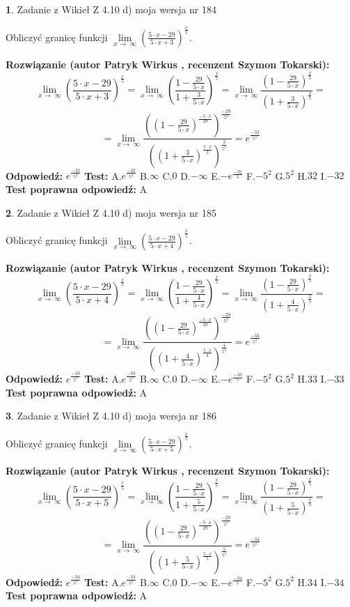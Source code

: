 \documentclass[12pt, a4paper]{article}
\theoremstyle{definition} %
\newtheorem{zad}{}
\newcommand{\zadStart}[1]{\begin{zad}#1\newline}
\newcommand{\zadStop}{\end{zad}}
\newcommand{\rozwStart}[2]{\noindent \textbf{Rozwiązanie (autor #1 , recenzent #2): }\newline}
\newcommand{\rozwStop}{\newline}
\newcommand{\odpStart}{\noindent \textbf{Odpowiedź:}\newline}
\newcommand{\odpStop}{\newline}
\newcommand{\testStart}{\noindent \textbf{Test:}\newline}
\newcommand{\testStop}{\newline}
\newcommand{\kluczStart}{\noindent \textbf{Test poprawna odpowiedź:}\newline}
\newcommand{\kluczStop}{\newline}
\begin{document}
\zadStart{Zadanie z Wikieł Z 4.10 d) moja wersja nr 184}


Obliczyć granicę funkcji  $\lim\limits_{x\to\ \infty}(\frac{5\cdot x-29}{5\cdot x+3})^{\frac{x}{5}}$.
\zadStop
\rozwStart{Patryk Wirkus}{Szymon Tokarski}
$$\lim\limits_{x\to\ \infty}(\frac{5\cdot x-29}{5\cdot x+3})^{\frac{x}{5}} = \lim\limits_{x\to\ \infty}(\frac{1-\frac{29}{5\cdot x}}{1+\frac{3}{5\cdot x}})^{\frac{x}{5}}=\lim\limits_{x\to\ \infty}\frac{(1-\frac{29}{5\cdot x})^{\frac{x}{5}}}{(1+\frac{3}{5\cdot x})^{\frac{x}{5}}}=$$
$$=\lim\limits_{x\to\ \infty}\frac{((1-\frac{29}{5\cdot x})^{\frac{-5\cdot x}{29}})^{\frac{-29}{5^{2}}}}{((1+\frac{3}{5\cdot x})^{\frac{5\cdot x}{3}})^{\frac{3}{5^{2}}}}=e^{\frac{-32}{5^{2}}}$$
\rozwStop
\odpStart
$e^{\frac{-32}{5^{2}}}$
\odpStop
\testStart
A.$e^{\frac{-32}{5^{2}}}$ B.$\infty$ C.$0$ D.$-\infty$ E.$-e^{\frac{-32}{5}}$
F.$-5^{2}$ G.$5^{2}$
H.$32$
I.$-32$
\testStop
\kluczStart
A
\kluczStop



\zadStart{Zadanie z Wikieł Z 4.10 d) moja wersja nr 185}


Obliczyć granicę funkcji  $\lim\limits_{x\to\ \infty}(\frac{5\cdot x-29}{5\cdot x+4})^{\frac{x}{5}}$.
\zadStop
\rozwStart{Patryk Wirkus}{Szymon Tokarski}
$$\lim\limits_{x\to\ \infty}(\frac{5\cdot x-29}{5\cdot x+4})^{\frac{x}{5}} = \lim\limits_{x\to\ \infty}(\frac{1-\frac{29}{5\cdot x}}{1+\frac{4}{5\cdot x}})^{\frac{x}{5}}=\lim\limits_{x\to\ \infty}\frac{(1-\frac{29}{5\cdot x})^{\frac{x}{5}}}{(1+\frac{4}{5\cdot x})^{\frac{x}{5}}}=$$
$$=\lim\limits_{x\to\ \infty}\frac{((1-\frac{29}{5\cdot x})^{\frac{-5\cdot x}{29}})^{\frac{-29}{5^{2}}}}{((1+\frac{4}{5\cdot x})^{\frac{5\cdot x}{4}})^{\frac{4}{5^{2}}}}=e^{\frac{-33}{5^{2}}}$$
\rozwStop
\odpStart
$e^{\frac{-33}{5^{2}}}$
\odpStop
\testStart
A.$e^{\frac{-33}{5^{2}}}$ B.$\infty$ C.$0$ D.$-\infty$ E.$-e^{\frac{-33}{5}}$
F.$-5^{2}$ G.$5^{2}$
H.$33$
I.$-33$
\testStop
\kluczStart
A
\kluczStop



\zadStart{Zadanie z Wikieł Z 4.10 d) moja wersja nr 186}


Obliczyć granicę funkcji  $\lim\limits_{x\to\ \infty}(\frac{5\cdot x-29}{5\cdot x+5})^{\frac{x}{5}}$.
\zadStop
\rozwStart{Patryk Wirkus}{Szymon Tokarski}
$$\lim\limits_{x\to\ \infty}(\frac{5\cdot x-29}{5\cdot x+5})^{\frac{x}{5}} = \lim\limits_{x\to\ \infty}(\frac{1-\frac{29}{5\cdot x}}{1+\frac{5}{5\cdot x}})^{\frac{x}{5}}=\lim\limits_{x\to\ \infty}\frac{(1-\frac{29}{5\cdot x})^{\frac{x}{5}}}{(1+\frac{5}{5\cdot x})^{\frac{x}{5}}}=$$
$$=\lim\limits_{x\to\ \infty}\frac{((1-\frac{29}{5\cdot x})^{\frac{-5\cdot x}{29}})^{\frac{-29}{5^{2}}}}{((1+\frac{5}{5\cdot x})^{\frac{5\cdot x}{5}})^{\frac{5}{5^{2}}}}=e^{\frac{-34}{5^{2}}}$$
\rozwStop
\odpStart
$e^{\frac{-34}{5^{2}}}$
\odpStop
\testStart
A.$e^{\frac{-34}{5^{2}}}$ B.$\infty$ C.$0$ D.$-\infty$ E.$-e^{\frac{-34}{5}}$
F.$-5^{2}$ G.$5^{2}$
H.$34$
I.$-34$
\testStop
\kluczStart
A
\kluczStop
\end{document}
